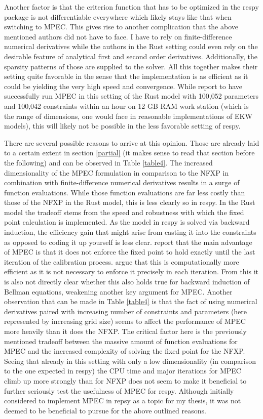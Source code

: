 Another factor is that the criterion function that has to be optimized in the respy package is not differentiable everywhere which likely stays like that when switching to MPEC. This gives rise to another complication that the above mentioned authors did not have to face. I have to rely on finite-difference numerical derivatives while the authors in the Rust setting could even rely on the desirable feature of analytical first and second order derivatives. Additionally, the sparsity patterns of those are supplied to the solver. All this together makes their setting quite favorable in the sense that the implementation is as efficient as it could be yielding the very high speed and convergence. While \cite{Su.Judd.2012} report to have successfully run MPEC in this setting of the Rust model with 100,052 parameters and 100,042 constraints within an hour on 12 GB RAM work station (which is the range of dimensions, one would face in reasonable implementations of EKW models), this will likely not be possible in the less favorable setting of respy.

There are several possible reasons to arrive at this opinion. Those are already laid to a certain extent in section \ref{partial} (it makes sense to read that section before the following) and can be observed in Table \ref{table4}. The increased dimensionality of the MPEC formulation in comparison to the NFXP in combination with finite-difference numerical derivatives results in a surge of function evaluations. While those function evaluations are far less costly than those of the NFXP in the Rust model, this is less clearly so in respy. In the Rust model the tradeoff stems from the speed and robustness with which the fixed point calculation is implemented. As the model in respy is solved via backward induction, the efficiency gain that might arise from casting it into the constraints as opposed to coding it up yourself is less clear. \cite{Su.Judd.2012} report that the main advantage of MPEC is that it does not enforce the fixed point to hold exactly until the last iteration of the calibration process. \cite{Aguirregabiria.2002} argue that this is computationally more efficient as it is not necessary to enforce it precisely in each iteration. From this it is also not directly clear whether this also holds true for backward induction of Bellman equations, weakening another key argument for MPEC. Another observation that can be made in Table \ref{table4} is that the fact of using numerical derivatives paired with increasing number of constraints and parameters (here represented by increasing grid size) seems to affect the performance of MPEC more heavily than it does the NFXP. The critical factor here is the previously mentioned tradeoff between the massive amount of function evaluations for MPEC and the increased complexity of solving the fixed point for the NFXP. Seeing that already in this setting with only a low dimensionality (in comparison to the one expected in respy) the CPU time and major iterations for MPEC climb up more strongly than for NFXP does not seem to make it beneficial to further seriously test the usefulness of MPEC for respy. Although initially considered to implement MPEC in repsy as a topic for my thesis, it was not deemed to be beneficial to pursue for the above outlined reasons.

